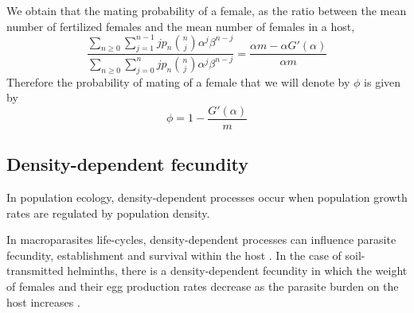 \documentclass[12pt,a4paper]{article}
\theoremstyle{plain}%
\theoremstyle{definition}
\theoremstyle{remark}
\begin{document}
	We obtain that the mating probability of a female, as the ratio between the mean number of fertilized females and the mean number of females in a host,
	\begin{equation*}
	\frac{\sum_{n\geq 0}\sum_{j=1}^{n-1}jp_n\binom{n}{j}\alpha^j\beta^{n-j}}
	{\sum_{n\geq 0}\sum_{j=0}^{n}jp_n\binom{n}{j}\alpha^j\beta^{n-j}}
	=\frac{\alpha  m -\alpha  G'(\alpha)}{\alpha m}
	\end{equation*}
	Therefore the probability of mating of a female that we will denote by $\phi$ is given by
	\begin{equation}\label{probrepro1}
	\phi=1-\frac{ G'(\alpha)}{m}
	\end{equation}
	
	
	\subsection{Density-dependent fecundity}
	In population ecology, density-dependent processes occur when population growth rates are regulated by population density.
	
In macroparasites life-cycles, density-dependent processes can influence parasite fecundity, establishment and survival within the host .  In the case of soil-transmitted helminths, there is a density-dependent fecundity in which the weight of females and their egg production rates decrease as the parasite burden on the host increases \cite{churcher2006density,walker2009density}.
	
\end{document}
